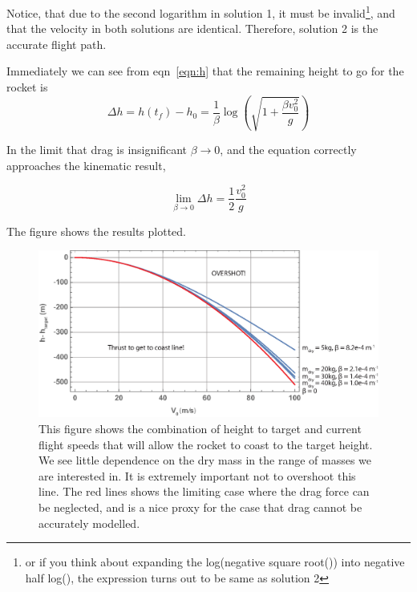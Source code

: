 \documentclass[12pt]{article}
\begin{document}
Notice, that due to the second logarithm in solution 1, it must be invalid\footnote{or if you think about expanding the log(negative square root()) into negative half log(), the expression turns out to be same as solution 2}, and that the velocity in both solutions are identical. Therefore, solution 2 is the accurate flight path. 

Immediately we can see from eqn~\ref{eqn:h} that the remaining height to go for the rocket is 
\begin{equation}
\boxed{\Delta h = h(t_f) - h_0 = \frac{1}{\beta} \log \left(\sqrt{1+\frac{\beta  v_0^2}{g}} \right)}
\end{equation}

In the limit that drag is insignificant $\beta \rightarrow 0$, and the equation correctly approaches the kinematic result, 

\begin{equation}
\lim_{\beta\rightarrow0} \Delta h = \frac{1}{2} \frac{v_0^2}{ g}
\end{equation}

The figure shows the results plotted. 


\begin{figure}[htbp]
   \centering
   \includegraphics[width=0.8\linewidth]{coast_regions}
   \caption{This figure shows the combination of height to target and current flight speeds that will allow the rocket to coast to the target height. We see little dependence on the dry mass in the range of masses we are interested in. It is extremely important not to overshoot this line. The red lines shows the limiting case where the drag force can be neglected, and is a nice proxy for the case that drag cannot be accurately modelled.}
   \label{fig:}
\end{figure}
\end{document}
